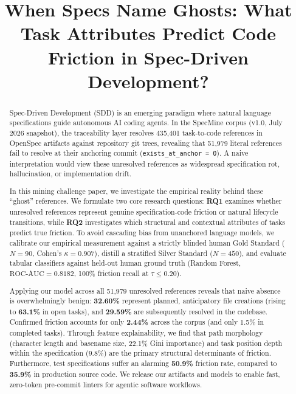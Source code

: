 \documentclass[10pt,conference]{IEEEtran}
\begin{document}
\title{When Specs Name Ghosts: What Task Attributes Predict Code Friction in Spec-Driven Development?}

\author{
}

\maketitle

\begin{abstract}
Spec-Driven Development (SDD) is an emerging paradigm where natural language specifications guide autonomous AI coding agents. In the SpecMine corpus (v1.0, July 2026 snapshot), the traceability layer resolves 435,401 task-to-code references in OpenSpec artifacts against repository git trees, revealing that 51,979 literal references fail to resolve at their anchoring commit (\texttt{exists\_at\_anchor = 0}). A naive interpretation would view these unresolved references as widespread specification rot, hallucination, or implementation drift. 

In this mining challenge paper, we investigate the empirical reality behind these ``ghost'' references. We formulate two core research questions: \textbf{RQ1} examines whether unresolved references represent genuine specification-code friction or natural lifecycle transitions, while \textbf{RQ2} investigates which structural and contextual attributes of tasks predict true friction. To avoid cascading bias from unanchored language models, we calibrate our empirical measurement against a strictly blinded human Gold Standard ($N=90$, Cohen's $\kappa = 0.907$), distill a stratified Silver Standard ($N=450$), and evaluate tabular classifiers against held-out human ground truth (Random Forest, $\text{ROC-AUC} = 0.8182$, 100\% friction recall at $\tau \le 0.20$). 

Applying our model across all 51,979 unresolved references reveals that naive absence is overwhelmingly benign: \textbf{32.60\%} represent planned, anticipatory file creations (rising to \textbf{63.1\%} in open tasks), and \textbf{29.59\%} are subsequently resolved in the codebase. Confirmed friction accounts for only \textbf{2.44\%} across the corpus (and only 1.5\% in completed tasks). Through feature explainability, we find that path morphology (character length and basename size, 22.1\% Gini importance) and task position depth within the specification (9.8\%) are the primary structural determinants of friction. Furthermore, test specifications suffer an alarming \textbf{50.9\%} friction rate, compared to \textbf{35.9\%} in production source code. We release our artifacts and models to enable fast, zero-token pre-commit linters for agentic software workflows.
\end{abstract}
\end{document}
